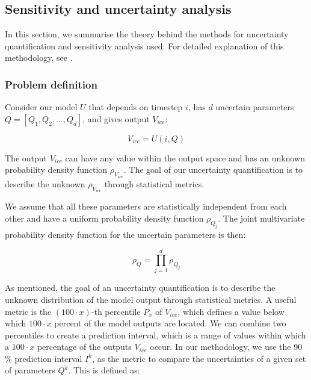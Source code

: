 \documentclass[utf8]{frontiersSCNS}
\begin{document}
\subsection{Sensitivity and uncertainty analysis} \label{sec:uncertainpy}
In this section, we summarise the theory behind the methods for uncertainty quantification and sensitivity
analysis used. For detailed explanation of this methodology, see \cite{uncertainpy_2018}.

\subsubsection{Problem definition}
Consider our model $U$ that depends on timestep $i$, has $d$ uncertain parameters $Q = [Q_1, Q_2, \dots, Q_d]$, and
gives output $V_{ice}$:

\begin{equation}
V_{ice} = U(i,Q)
\end{equation}

The output $V_{ice}$ can have any value within the output space and has an unknown probability density function
$\rho_{V_{ice}}$. The goal of our uncertainty quantification is to describe the unknown $\rho_{V_{ice}}$ through
statistical metrics.

We assume that all these parameters are statistically independent from each other and have a uniform probability
density function $\rho_{Q_j}$. The joint multivariate probability density function for the uncertain parameters
is then:

\begin{equation}
\rho_{Q} = \prod_{j = 1}^{d} \rho_{Q_j}
\end{equation}

As mentioned, the goal of an uncertainty quantification is to describe the unknown distribution of the model
output through statistical metrics. A useful metric is the $(100 \cdot x)$-th percentile $P_x$ of $V_{ice}$,
which defines a value below  which $100 \cdot x$ percent of the model outputs are located. We can combine two
percentiles to create a prediction interval, which is a range of values within which a $100 \cdot x$
percentage of the outputs $V_{ice}$ occur. In our methodology, we use the 90 \% prediction interval $I^k$, as
the metric to compare the uncertainties of a given set of parameters $Q^k$. This is defined as:  
\end{document}
